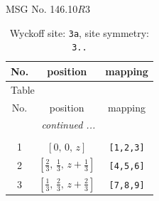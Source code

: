 \documentclass[fleqn,8pt]{jsarticle}
\begin{document}
\setcounter{MaxMatrixCols}{32}

\renewcommand{\tablename}{Table~}
\renewcommand{\figurename}{Figure~}
\begin{center}
\LARGE
MSG No. 146.10\quad$R3$
\end{center}
\renewcommand{\arraystretch}{1.2}
\begin{longtable}{ccc}
\caption{Wyckoff site: {\tt 3a}, site symmetry: {\tt 3..}}
 \\
 \hline \hline
No. & position & mapping \\ \hline \endfirsthead

\multicolumn{2}{l}{\tablename\ \thetable{}} \\
 \hline \hline
No. & position & mapping \\ \hline \endhead

 \hline \hline
\multicolumn{2}{r}{\footnotesize\it continued ...} \\ \endfoot

 \hline \hline
\multicolumn{2}{r}{} \\ \endlastfoot

1 & $\left[ 0,\, 0,\, z \right]$ & {\tt [1,2,3]} \\ \hline
2 & $\left[ \frac{2}{3},\, \frac{1}{3},\, z + \frac{1}{3} \right]$ & {\tt [4,5,6]} \\ \hline
3 & $\left[ \frac{1}{3},\, \frac{2}{3},\, z + \frac{2}{3} \right]$ & {\tt [7,8,9]} \\
\end{longtable}
\renewcommand{\arraystretch}{1.2}
\end{document}

